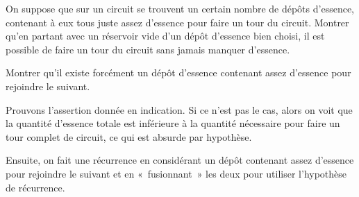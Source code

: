 \begin{exo}
On suppose que sur un circuit se trouvent un certain nombre de dépôts d'essence, contenant à eux tous juste assez d'essence pour faire un tour du circuit. Montrer qu'en partant avec un réservoir vide d'un dépôt d'essence bien choisi, il est possible de faire un tour du circuit sans jamais manquer d'essence.
\begin{hint}
Montrer qu'il existe forcément un dépôt d'essence contenant assez d'essence pour rejoindre le suivant.
\end{hint}
\begin{sol}
Prouvons l'assertion donnée en indication. Si ce n'est pas le cas, alors on voit que la quantité d'essence totale est inférieure à la quantité nécessaire pour faire un tour complet de circuit, ce qui est absurde par hypothèse.

Ensuite, on fait une récurrence en considérant un dépôt contenant assez d'essence pour rejoindre le suivant et en «~fusionnant~» les deux pour utiliser l'hypothèse de récurrence.
\end{sol}
\end{exo}


